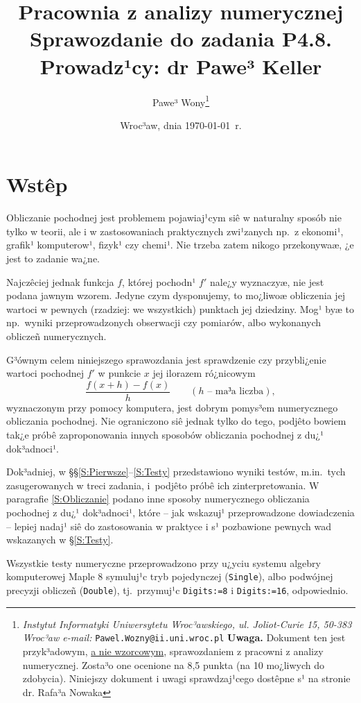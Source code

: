 \documentclass[11pt,leqno]{article}
\title{{\textbf{Pracownia z analizy numerycznej}}\\[1ex]
       {\Large Sprawozdanie do zadania \textbf{P4.8.}}\\[-1ex]
       {\large Prowadz¹cy: dr Pawe³ Keller}}
\author{Pawe³ Wony\thanks{\textit{Instytut Informatyki Uniwersytetu
                       Wroc³awskiego, ul. Joliot-Curie 15, 50-383 Wroc³aw
\newline e-mail:} \texttt{Pawel.Wozny@ii.uni.wroc.pl}\newline
\newline\textsf{\textbf{Uwaga.} Dokument ten jest przyk³adowym, 
                \underline{a nie wzorcowym}, sprawozdaniem z pracowni 
		z analizy numerycznej. Zosta³o one ocenione na 8,5 punkta (na
		10 mo¿liwych do zdobycia). Niniejszy dokument i uwagi
		sprawdzaj¹cego dostêpne s¹ na stronie dr. Rafa³a Nowaka}}}
\date{Wroc³aw, dnia \today\ r.}
\begin{document}
\thispagestyle{empty}
\maketitle

\section{Wstêp}
\setcounter{equation}{0}

Obliczanie pochodnej jest problemem pojawiaj¹cym siê w naturalny sposób 
nie tylko w teorii, ale i w zastosowaniach praktycznych zwi¹zanych np.~z
ekonomi¹, grafik¹ komputerow¹, fizyk¹ czy chemi¹. Nie trzeba zatem nikogo
przekonywaæ, ¿e jest to zadanie wa¿ne.

Najczêciej jednak funkcja $f$, której pochodn¹ $f'$ nale¿y wyznaczyæ, nie jest
podana jawnym wzorem. Jedyne czym dysponujemy, to mo¿liwoæ obliczenia jej
wartoci w pewnych (rzadziej: we wszystkich) punktach jej dziedziny. Mog¹ byæ to
np.~wyniki przeprowadzonych obserwacji czy pomiarów, albo wykonanych obliczeñ
numerycznych.

G³ównym celem niniejszego sprawozdania jest sprawdzenie czy przybli¿enie
wartoci pochodnej $f'$ w punkcie $x$ jej ilorazem ró¿nicowym
\begin{equation}\label{E:IlorazRoz}
\frac{f(x+h)-f(x)}{h}\qquad (\mbox{$h$ -- ma³a liczba}),
\end{equation}
wyznaczonym przy pomocy komputera, jest dobrym pomys³em numerycznego obliczania
pochodnej. Nie ograniczono siê jednak tylko do tego, podjêto bowiem tak¿e próbê
zaproponowania innych sposobów obliczania pochodnej z du¿¹ dok³adnoci¹.   

Dok³adniej, w \S\S\ref{S:Pierwsze}--\ref{S:Testy} przedstawiono wyniki testów,
m.in.~tych zasugerowanych w treci zadania, i~podjêto próbê ich zinterpretowania. 
W paragrafie \ref{S:Obliczanie} podano inne sposoby numerycznego obliczania
pochodnej z du¿¹ dok³adnoci¹, które -- jak wskazuj¹ przeprowadzone
dowiadczenia -- lepiej nadaj¹ siê do zastosowania w praktyce i s¹ pozbawione
pewnych wad wskazanych w \S\ref{S:Testy}.

Wszystkie testy numeryczne przeprowadzono przy u¿yciu systemu algebry
komputerowej \textsf{Maple 8} symuluj¹c tryb pojedynczej (\texttt{Single}), albo
podwójnej precyzji obliczeñ (\texttt{Double}), tj.~przymuj¹c \texttt{Digits:=8}
i \texttt{Digits:=16}, odpowiednio. 
\end{document}
